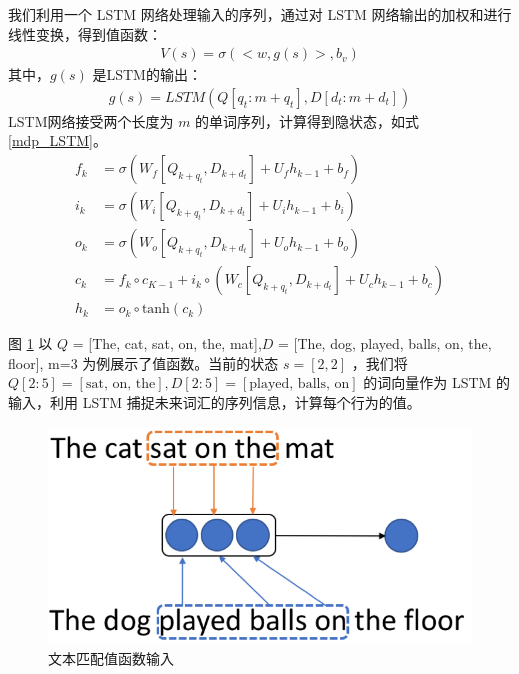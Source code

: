 \begin{enumerate}
		我们利用一个 LSTM 网络处理输入的序列，通过对 LSTM 网络输出的加权和进行线性变换，得到值函数：
	\begin{equation}\label{value_func}
	\begin{aligned}
		V(s) = \sigma(<w, g(s)>, b_v)
	\end{aligned}
	\end{equation}
		其中，$g(s)$ 是LSTM的输出：
	\begin{equation}\label{g(s)}
	\begin{aligned}
		g(s) = LSTM(Q[q_t: m+q_t], D[d_t: m+d_t])
	\end{aligned}
	\end{equation}
		LSTM网络接受两个长度为 $m$ 的单词序列，计算得到隐状态，如式\ref{mdp_LSTM}。
	\begin{equation}\label{mdp_LSTM}
	\begin{aligned}
		f_k &= \sigma(W_f[Q_{k+q_{t}}, D_{k+d_{t}}] + U_fh_{k-1} + b_f) \\
i_k &= \sigma(W_i[Q_{k+q_{t}}, D_{k+d_{t}}] + U_ih_{k-1} + b_i) \\
o_k &= \sigma(W_o[Q_{k+q_{t}}, D_{k+d_{t}}] + U_oh_{k-1} + b_o) \\
c_k &= f_k \circ c_{K-1} + i_k \circ (W_c[Q_{k+q_{t}}, D_{k+d_{t}}] + U_ch_{k-1}+b_c) \\
h_k &= o_k \circ \text{tanh}(c_k)
	\end{aligned}
	\end{equation}

\end{enumerate}

图 \ref{fig:value_function_input} 以 $Q$ = [The, cat, sat, on, the, mat],$D$ = [The, dog, played, balls, on, the, floor], m=3 为例展示了值函数。当前的状态 $s=[2, 2]$ ，我们将 $Q[2:5]=[\text{sat, on, the}], D[2:5]=[\text{played, balls, on}]$ 的词向量作为 LSTM 的输入，利用 LSTM 捕捉未来词汇的序列信息，计算每个行为的值。

\begin{figure}[h]\centering
\vspace{1em}
  \includegraphics[width=0.6\linewidth]{figures/match_value_function}
  \caption{文本匹配值函数输入}
  \label{fig:value_function_input}       %
\vspace{1em}
\end{figure}



